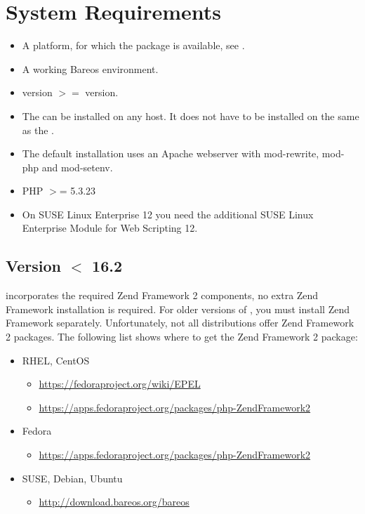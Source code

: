 \section{System Requirements}

\begin{itemize}
\item A platform, for which the  package is available, see .
\item A working Bareos environment.
\item \bareosDir version $>=$ \bareosWebui version.
\item The \bareosWebui can be installed on any host. It does not have to be installed on the same as the \bareosDir.
\item The default installation uses an Apache webserver with mod-rewrite, mod-php and mod-setenv.
\item PHP $>$= 5.3.23
\item On SUSE Linux Enterprise 12 you need the additional SUSE Linux Enterprise Module for Web Scripting 12.
\end{itemize}

\subsection{Version $<$ 16.2}

\bareosWebui {} incorporates the required Zend Framework 2 components, no extra Zend Framework installation is required.
For older versions of , you must install Zend Framework separately.
Unfortunately, not all distributions offer Zend Framework 2 packages.
The following list shows where to get the Zend Framework 2 package:

\begin{itemize}
  \item RHEL, CentOS
    \begin{itemize}
    \item \url{https://fedoraproject.org/wiki/EPEL}
    \item \url{https://apps.fedoraproject.org/packages/php-ZendFramework2}
    \end{itemize}

  \item Fedora
    \begin{itemize}
    \item \url{https://apps.fedoraproject.org/packages/php-ZendFramework2}
    \end{itemize}

  \item SUSE, Debian, Ubuntu
    \begin{itemize}
    \item \url{http://download.bareos.org/bareos}
    \end{itemize}
\end{itemize}

